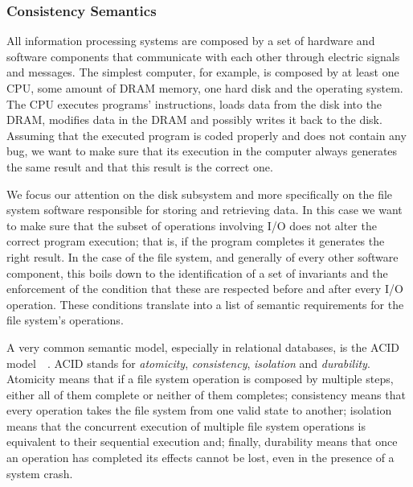 \subsubsection{Consistency Semantics}
All information processing systems are composed by a set of hardware and software components that communicate with each other through electric signals and messages. The simplest computer, for example, is composed by at 
least one CPU, some amount of DRAM memory, one hard disk and the operating system. The CPU executes programs' instructions, loads data from the disk into the DRAM, modifies data in the DRAM and possibly writes it 
back to the disk. Assuming that the executed program is coded properly and does not contain any bug, we want to make sure that its execution in the computer always generates the same result and that this result is the 
correct one.

We focus our attention on the disk subsystem and more specifically on the file system software responsible for storing and retrieving data. In this case we want to make sure that the subset of operations involving I/O 
does not alter the correct program execution; that is, if the program completes it generates the right result. In the case of the file system, and generally of every other software component, this boils down to 
the identification of a set of invariants and the enforcement of the condition that these are respected before and after every I/O operation. These conditions translate into a list of semantic requirements for the
file system's operations. 

A very common semantic model, especially in relational databases, is the ACID model~\cite{Gray1981}~\cite{Wright2007}. ACID stands for \textit{atomicity}, \textit{consistency}, \textit{isolation} and \textit{durability}. 
Atomicity means that if a file system operation is composed by multiple steps, either all of them complete or neither of them completes; consistency means that every operation takes the file system from one valid 
state to another; isolation means that the concurrent execution of multiple file system operations is equivalent to their sequential execution and; finally, durability means that once an operation has completed its 
effects cannot be lost, even in the presence of a system crash.

